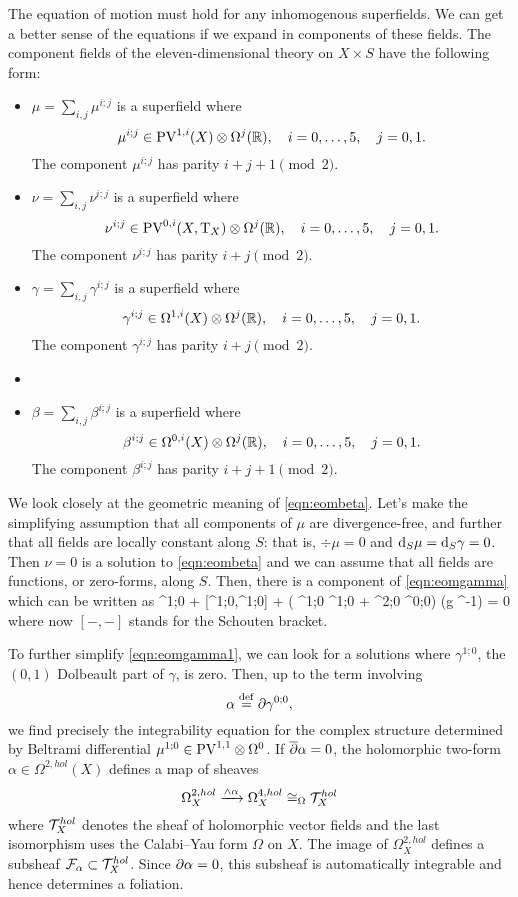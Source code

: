 The equation of motion must hold for any inhomogenous superfields.
We can get a better sense of the equations if we expand in components of these fields. 
The component fields of the eleven-dimensional theory on $X \times S$ have the following form: 
\begin{itemize}
\item $\mu = \sum_{i,j} \mu^{i;j}$ is a superfield where
\[
\mu^{i;j} \in {\rm PV}^{1,i}(X) \otimes \Omega^j(\mathbb R) ,\quad i=0,\ldots, 5, \quad j=0,1.
\]
The component $\mu^{i;j}$ has parity $i+j+1 \pmod 2$. 
\item $\nu = \sum_{i,j} \nu^{i;j}$ is a superfield where
\[
\nu^{i;j} \in {\rm PV}^{0,i}(X, {\rm T}_X) \otimes \Omega^j(\mathbb R) ,\quad i=0,\ldots, 5, \quad j=0,1.
\]
The component $\nu^{i;j}$ has parity $i+j \pmod 2$. 
\item 
$\gamma = \sum_{i,j} \gamma^{i;j}$ is a superfield where
\[
\gamma^{i;j} \in \Omega^{1,i}(X) \otimes \Omega^j(\mathbb R) ,\quad i=0,\ldots, 5, \quad j=0,1.
\]
The component $\gamma^{i;j}$ has parity $i+j\pmod 2$. 
\item 
\item $\beta = \sum_{i,j} \beta^{i;j}$ is a superfield where
\[
\beta^{i;j} \in \Omega^{0,i}(X) \otimes \Omega^j(\mathbb R) ,\quad i=0,\ldots, 5, \quad j=0,1.
\]
The component $\beta^{i;j}$ has parity $i+j+1 \pmod 2$. 
\end{itemize}

We look closely at the geometric meaning of \eqref{eqn:eombeta}. 
Let's make the simplifying assumption that all components of $\mu$ are divergence-free, and further that all fields are locally constant along $S$: that is, $\div \mu = 0$ and ${\rm d}_S \mu = {\rm d}_S \gamma = 0$.
Then $\nu = 0$ is a solution to \eqref{eqn:eombeta} and we can assume that all fields are functions, or zero-forms, along $S$. 
Then, there is a component of \eqref{eqn:eomgamma} which can be written as 
\beqn\label{eqn:eomgamma1}
\dbar \mu^{1;0} +  [\mu^{1;0},\mu^{1;0}] + \left( \del \gamma^{1;0} \wedge \del \gamma^{1;0} + \del \gamma^{2;0} \wedge \del \gamma^{0;0}\right) \vee (g \Omega^{-1}) = 0 
\eeqn
where now $[-,-]$ stands for the Schouten bracket.

To further simplify \eqref{eqn:eomgamma1}, we can look for a solutions where  $\gamma^{1;0}$, the $(0,1)$ Dolbeault part of $\gamma$, is zero. 
Then, up to the term involving 
\[
\alpha \overset{\rm def}{=} \partial \gamma^{0;0},
\]
we find precisely the integrability equation for the complex structure determined by Beltrami differential $\mu^{1;0} \in {\rm PV}^{1,1} \otimes \Omega^0$. 
If $\overline{\partial} \alpha = 0$, the holomorphic two-form $\alpha \in \Omega^{2,hol}(X)$ defines a map of sheaves
\[
\Omega^{2,hol}_X \xrightarrow{\wedge \alpha} \Omega^{4,hol}_X \cong_\Omega \mathcal T^{hol}_X
\]
where $\mathcal T^{hol}_X$ denotes the sheaf of holomorphic vector fields and the last isomorphism uses the Calabi--Yau form $\Omega$ on $X$.  
The image of $\Omega^{2,hol}_X$ defines a subsheaf $\mathcal F_{\alpha} \subset \mathcal T^{hol}_X$. 
Since $\partial \alpha = 0$, this subsheaf is automatically integrable and hence determines a foliation. 

